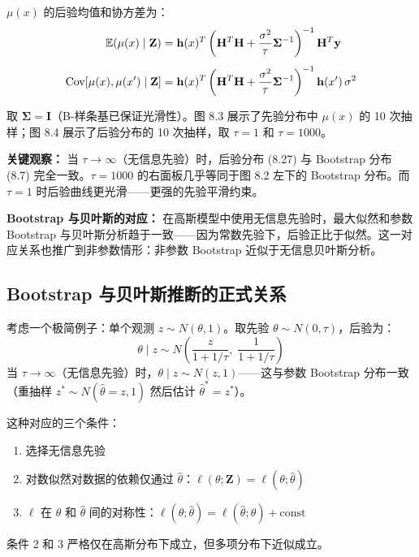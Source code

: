 $\mu(x)$ 的后验均值和协方差为：
\begin{equation}\label{eq:posterior_mu}
    \begin{aligned}
        \mathbb{E}(\mu(x) \mid \mathbf{Z}) &= \mathbf{h}(x)^T\left(\mathbf{H}^T\mathbf{H} + \frac{\sigma^2}{\tau}\mathbf{\Sigma}^{-1}\right)^{-1}\mathbf{H}^T\mathbf{y} \\[4pt]
        \mathrm{Cov}[\mu(x), \mu(x') \mid \mathbf{Z}] &= \mathbf{h}(x)^T\left(\mathbf{H}^T\mathbf{H} + \frac{\sigma^2}{\tau}\mathbf{\Sigma}^{-1}\right)^{-1}\mathbf{h}(x')\,\sigma^2
    \end{aligned}
\end{equation}

取 $\mathbf{\Sigma} = \mathbf{I}$（B-样条基已保证光滑性）。图 8.3 展示了先验分布中 $\mu(x)$ 的 10 次抽样；图 8.4 展示了后验分布的 10 次抽样，取 $\tau=1$ 和 $\tau=1000$。

\textbf{关键观察：} 当 $\tau \to \infty$（无信息先验）时，后验分布 (8.27) 与 Bootstrap 分布 (8.7) 完全一致。$\tau=1000$ 的右面板几乎等同于图 8.2 左下的 Bootstrap 分布。而 $\tau=1$ 时后验曲线更光滑——更强的先验平滑约束。

\textbf{Bootstrap 与贝叶斯的对应：} 在高斯模型中使用无信息先验时，最大似然和参数 Bootstrap 与贝叶斯分析趋于一致——因为常数先验下，后验正比于似然。这一对应关系也推广到非参数情形：非参数 Bootstrap 近似于无信息贝叶斯分析。

\subsection{Bootstrap 与贝叶斯推断的正式关系}

考虑一个极简例子：单个观测 $z \sim N(\theta, 1)$。取先验 $\theta \sim N(0, \tau)$，后验为：
\begin{equation}
    \theta \mid z \sim N\!\left(\frac{z}{1+1/\tau},\; \frac{1}{1+1/\tau}\right)
\end{equation}
当 $\tau \to \infty$（无信息先验）时，$\theta \mid z \sim N(z, 1)$——这与参数 Bootstrap 分布一致（重抽样 $z^* \sim N(\hat{\theta}=z, 1)$ 然后估计 $\hat{\theta}^*=z^*$）。

这种对应的三个条件：
\begin{enumerate}
    \item 选择无信息先验
    \item 对数似然对数据的依赖仅通过 $\hat{\theta}$：$\ell(\theta; \mathbf{Z}) = \ell(\theta; \hat{\theta})$
    \item $\ell$ 在 $\theta$ 和 $\hat{\theta}$ 间的对称性：$\ell(\theta; \hat{\theta}) = \ell(\hat{\theta}; \theta) + \text{const}$
\end{enumerate}
条件 2 和 3 严格仅在高斯分布下成立，但多项分布下近似成立。

